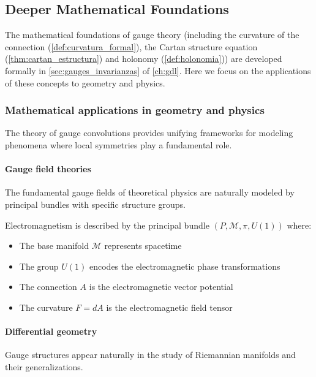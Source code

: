 \subsection{Deeper Mathematical Foundations}

The mathematical foundations of gauge theory (including the curvature of the connection (\autoref{def:curvatura_formal}), the Cartan structure equation (\autoref{thm:cartan_estructura}) and holonomy (\autoref{def:holonomia})) are developed formally in \autoref{sec:gauges_invarianzas} of \autoref{ch:gdl}. Here we focus on the applications of these concepts to geometry and physics.

\subsubsection{Mathematical applications in geometry and physics}

The theory of gauge convolutions provides unifying frameworks for modeling phenomena where local symmetries play a fundamental role.

\paragraph{Gauge field theories}
The fundamental gauge fields of theoretical physics are naturally modeled by principal bundles with specific structure groups.

\begin{example}
Electromagnetism is described by the principal bundle $(P, \mathcal{M}, \pi, U(1))$ where:
\begin{itemize}
\item The base manifold $\mathcal{M}$ represents spacetime
\item The group $U(1)$ encodes the electromagnetic phase transformations
\item The connection $A$ is the electromagnetic vector potential
\item The curvature $F = dA$ is the electromagnetic field tensor
\end{itemize}
\end{example}

\paragraph{Differential geometry}
Gauge structures appear naturally in the study of Riemannian manifolds and their generalizations.

